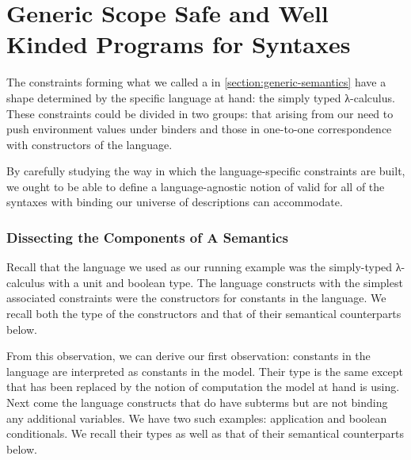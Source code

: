 \chapter{Generic Scope Safe and Well Kinded Programs for Syntaxes}
\label{chapter:generic-semantics}

The constraints forming what we called a  in
\cref{section:generic-semantics} have a shape determined by the
specific language at hand: the simply typed λ-calculus.
%
These constraints could be divided in two groups: that arising
from our need to push environment values under binders and those
in one-to-one correspondence with constructors of the language.

By carefully studying the way in which the language-specific
constraints are built, we ought to be able to define a
language-agnostic notion of  valid for all of
the syntaxes with binding our universe of descriptions can
accommodate.

\subsection{Dissecting the Components of A Semantics}

Recall that the language we used as our running example was the
simply-typed λ-calculus with a unit and boolean type.
%
The language constructs with the simplest associated 
constraints were the constructors for constants in the language. We
recall both the type of the constructors and that of their semantical
counterparts below.

\noindent\begin{minipage}[t]{0.4\textwidth}
\end{minipage}\begin{minipage}[t]{0.6\textwidth}
  \begin{AgdaSuppressSpace}
  \end{AgdaSuppressSpace}
\end{minipage}

From this observation, we can derive our first observation:
constants in the language are interpreted as constants in
the model. Their type is the same except that  has
been replaced by the notion of computation  the model
at hand is using.
%
Next come the language constructs that do have subterms but are not
binding any additional variables. We have two such examples: application
and boolean conditionals. We recall their types as well as that of their
semantical counterparts below.


